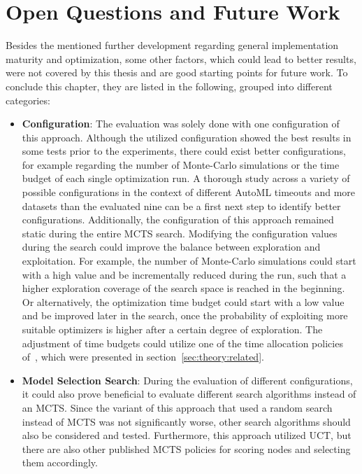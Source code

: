 \section{Open Questions and Future Work}
Besides the mentioned further development regarding general implementation maturity and optimization, some other factors, which could lead to better results, were not covered by this thesis and are good starting points for future work.
To conclude this chapter, they are listed in the following, grouped into different categories:
\begin{itemize}
    \item \textbf{Configuration}: The evaluation was solely done with one configuration of this approach.
    Although the utilized configuration showed the best results in some tests prior to the experiments, there could exist better configurations, for example regarding the number of Monte-Carlo simulations or the time budget of each single optimization run.
    A thorough study across a variety of possible configurations in the context of different AutoML timeouts and more datasets than the evaluated nine can be a first next step to identify better configurations.\newline
    Additionally, the configuration of this approach remained static during the entire MCTS search.
    Modifying the configuration values during the search could improve the balance between exploration and exploitation.
    For example, the number of Monte-Carlo simulations could start with a high value and be incrementally reduced during the run, such that a higher exploration coverage of the search space is reached in the beginning.
    Or alternatively, the optimization time budget could start with a low value and be improved later in the search, once the probability of exploiting more suitable optimizers is higher after a certain degree of exploration.
    The adjustment of time budgets could utilize one of the time allocation policies of~\textcite{Quemy-Two-Stage-Optimization}, which were presented in section~\ref{sec:theory:related}.
    \item \textbf{Model Selection Search}: During the evaluation of different configurations, it could also prove beneficial to evaluate different search algorithms instead of an MCTS.
    Since the variant of this approach that used a random search instead of MCTS was not significantly worse, other search algorithms should also be considered and tested.\newline
    Furthermore, this approach utilized UCT, but there are also other published MCTS policies for scoring nodes and selecting them accordingly.

\end{itemize}
